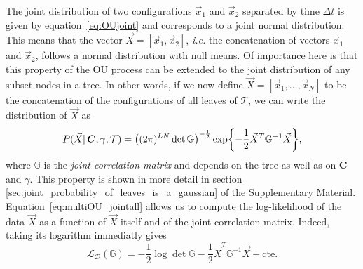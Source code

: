 \documentclass[preprint,amsmath,amssymb,superscriptaddress,showpacs,pre]{revtex4-1}
\let\originalleft\left
\let\originalright\right
\renewcommand{\left}{\mathopen{}\mathclose\bgroup\originalleft}
\renewcommand{\right}{\aftergroup\egroup\originalright}
\def\vx{\vec x}
\newcommand{\curlynormal}[1]{\exp\left\{-\frac{1}{2} #1 \right\}}
\begin{document}
The joint distribution of two configurations $\vx_1$ and $\vx_2$ separated by time $\Delta t$ is given by equation~\ref{eq:OUjoint} and corresponds to a joint normal distribution. 
This means that the vector $\vec{X}=[\vx_1, \vx_2]$, \emph{i.e.} the concatenation of vectors $\vx_1$ and $\vx_2$, follows a normal distribution with null means.
Of importance here is that this property of the OU process can be extended to the joint distribution of any subset nodes in a tree. 
In other words, if we now define $\vec{X}=[\vx_1,\ldots,\vx_N]$ to be the concatenation of the configurations of all leaves of $\mathcal{T}$, we can write the distribution of $\vec{X}$ as
\begin{equation}
	P(\vec{X}\vert\,\bm{C},\gamma,\mathcal{T}) = \left((2\pi)^{LN}\det\mathbb{G}\right)^{-\frac{1}{2}}\curlynormal{\vec{X}^T\mathbb{G}^{-1}\vec{X}},
	\label{eq:multiOU_jointall}
\end{equation}
where $\mathbb{G}$ is the \emph{joint correlation matrix} and depends on the tree as well as on $\bm{C}$ and $\gamma$.
This property is shown in more detail in section \ref{sec:joint_probability_of_leaves_is_a_gaussian} of the Supplementary Material.\\
Equation~\ref{eq:multiOU_jointall} allows us to compute the log-likelihood of the data $\vec{X}$ as a function of $\vec{X}$ itself and of the joint correlation matrix. 
Indeed, taking its logarithm immediatly gives
\begin{equation}
	\mathcal{L}_{\mathcal{D}}(\mathbb{G}) = -\frac 1 2 \log \det  \mathbb{G}  -\frac 1 2 \vec{X}^T\mathbb{G}^{-1} \vec{X} + \text{cte}. 
	\label{eq:likelihood_2}
\end{equation}
\end{document}
